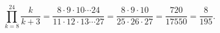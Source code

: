 \[\prod_{k=8}^{24}\dfrac{k}{k+3}=\dfrac{8\cdot9\cdot10\cdots24}{11\cdot12\cdot13\cdots27}=\dfrac{8\cdot9\cdot10}{25\cdot26\cdot27}=\dfrac{720}{17550}=\boxed{\dfrac{8}{195}}.\]
